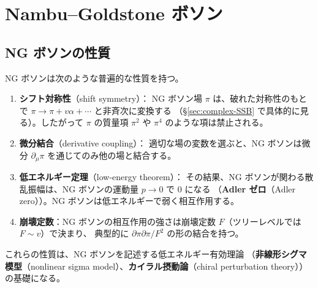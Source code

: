 \documentclass[uplatex,dvipdfmx,a4paper,11pt,openany]{jsbook}
\newcommand{\term}[2]{\textbf{#1}（#2）}
\newcommand{\en}[1]{（#1）}
\numberwithin{equation}{chapter}
\theoremstyle{definition}
\theoremstyle{plain}
\theoremstyle{remark}
\begin{document}
\section{Nambu--Goldstone ボソン}
\label{sec:NG-boson}
\subsection{NG ボソンの性質}
NG ボソンは次のような普遍的な性質を持つ。
\begin{enumerate}
    \item \textbf{シフト対称性}\en{shift symmetry}：
    NG ボソン場 $\pi$ は、破れた対称性のもとで $\pi\to\pi+v\alpha+\cdots$ と非斉次に変換する
    （\S\ref{sec:complex-SSB} で具体的に見る）。したがって $\pi$ の質量項 $\pi^2$ や $\pi^4$ のような項は禁止される。
    \item \textbf{微分結合}\en{derivative coupling}：
    適切な場の変数を選ぶと、NG ボソンは微分 $\partial_\mu\pi$ を通じてのみ他の場と結合する。
    \item \textbf{低エネルギー定理}\en{low-energy theorem}：
    その結果、NG ボソンが関わる散乱振幅は、NG ボソンの運動量 $p\to0$ で 0 になる
    （\term{Adler ゼロ}{Adler zero}）。NG ボソンは低エネルギーで弱く相互作用する。
    \item \textbf{崩壊定数}：NG ボソンの相互作用の強さは崩壊定数 $F$（ツリーレベルでは $F\sim v$）で決まり、
    典型的に $\partial\pi\partial\pi/F^2$ の形の結合を持つ。
\end{enumerate}
これらの性質は、NG ボソンを記述する低エネルギー有効理論
（\term{非線形シグマ模型}{nonlinear sigma model}、\term{カイラル摂動論}{chiral perturbation theory}）の基礎になる。
\end{document}

